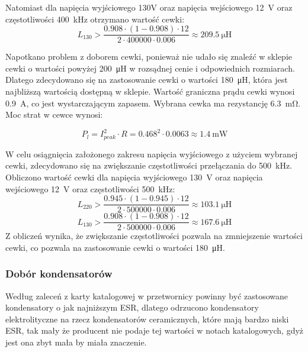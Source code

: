 \documentclass[../../main.tex]{subfiles}
\begin{document}
Natomiast dla napięcia wyjściowego 130\si{\volt} oraz napięcia wejściowego \SI{12}{\volt} oraz częstotliwości \SI{400}{\kilo\hertz} otrzymano wartość cewki:
\begin{equation}
    L_{130} > \frac{0.908 \cdot (1-0.908) \cdot 12}{2 \cdot 400000 \cdot 0.006} \approx \SI{209.5}{\micro\henry}
\end{equation}

Napotkano problem z doborem cewki, ponieważ nie udało się znaleźć w sklepie cewki o wartości powyżej \SI{200}{\micro\henry} w rozsądnej cenie i odpowiednich rozmiarach.
Dlatego zdecydowano się na zastosowanie cewki o wartości \SI{180}{\micro\henry}, która jest najbliższą wartością dostępną w sklepie. Wartość
graniczna prądu cewki wynosi \SI{0.9}{\ampere}, co jest wystarczającym zapasem. Wybrana cewka ma rezystancję \SI{6.3}{\milli\ohm}.
Moc strat w cewce wynosi:

\begin{equation}
    P_{l} = I_{peak}^2 \cdot R = 0.468^2 \cdot 0.0063 \approx \SI{1.4}{\milli\watt}
\end{equation}

W celu osiągnięcia założonego zakresu napięcia wyjściowego z użyciem wybranej cewki, zdecydowano się na zwiększanie częstotliwości przełączania do \SI{500}{\kilo\hertz}.
Obliczono wartość cewki dla napięcia wyjściowego \SI{130}{\volt} oraz napięcia wejściowego \SI{12}{\volt} oraz częstotliwości \SI{500}{\kilo\hertz}:
\begin{equation}
    L_{220} > \frac{0.945 \cdot (1-0.945) \cdot 12}{2 \cdot 500000 \cdot 0.006} \approx \SI{103.1}{\micro\henry}
\end{equation}
\begin{equation}
    L_{130} > \frac{0.908 \cdot (1-0.908) \cdot 12}{2 \cdot 500000 \cdot 0.006} \approx \SI{167.6}{\micro\henry}
\end{equation}
Z obliczeń wynika, że zwiększanie częstotliwości pozwala na zmniejszenie wartości cewki, co pozwala na zastosowanie cewki o wartości \SI{180}{\micro\henry}.

\subsubsection{Dobór kondensatorów}
Według zaleceń z karty katalogowej w przetwornicy powinny być zastosowane kondensatory o jak najniższym ESR,
dlatego odrzucono kondensatory elektrolityczne na rzecz kondensatorów ceramicznych, które mają bardzo niski ESR, tak
mały że producent nie podaje tej wartości w notach katalogowych, gdyż jest ona zbyt mała by miała znaczenie.
\end{document}
